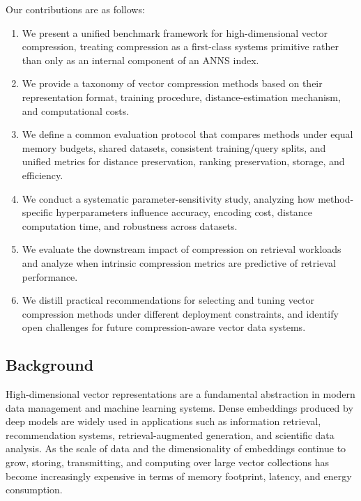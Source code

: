 \documentclass[sigconf]{acmart}
\begin{document}
Our contributions are as follows:

\begin{enumerate}
    \item We present a unified benchmark framework for high-dimensional vector compression, treating compression as a first-class systems primitive rather than only as an internal component of an ANNS index.

    \item We provide a taxonomy of vector compression methods based on their representation format, training procedure, distance-estimation mechanism, and computational costs.

    \item We define a common evaluation protocol that compares methods under equal memory budgets, shared datasets, consistent training/query splits, and unified metrics for distance preservation, ranking preservation, storage, and efficiency.

    \item We conduct a systematic parameter-sensitivity study, analyzing how method-specific hyperparameters influence accuracy, encoding cost, distance computation time, and robustness across datasets.

    \item We evaluate the downstream impact of compression on retrieval workloads and analyze when intrinsic compression metrics are predictive of retrieval performance.

    \item We distill practical recommendations for selecting and tuning vector compression methods under different deployment constraints, and identify open challenges for future compression-aware vector data systems.
\end{enumerate}

\subsection{Background}

High-dimensional vector representations are a fundamental abstraction in modern data management and machine learning systems. 
Dense embeddings produced by deep models are widely used in applications such as information retrieval, recommendation systems, retrieval-augmented generation,
and scientific data analysis. 
As the scale of data and the dimensionality of embeddings continue to grow, storing, transmitting, and computing over large vector collections has become increasingly expensive in terms of memory footprint, latency, and energy consumption.
\end{document}
